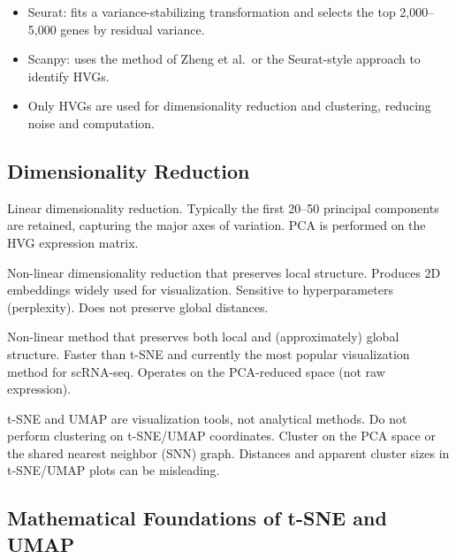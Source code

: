 \begin{itemize}[nosep]
  \item Seurat: fits a variance-stabilizing transformation and selects the top
    2,000--5,000 genes by residual variance.
  \item Scanpy: uses the method of Zheng et al.\ or the Seurat-style approach
    to identify HVGs.
  \item Only HVGs are used for dimensionality reduction and clustering,
    reducing noise and computation.
\end{itemize}

\subsection{Dimensionality Reduction}

\begin{description}[style=nextline]
  \item[PCA (Principal Component Analysis)] Linear dimensionality reduction.
    Typically the first 20--50 principal components are retained, capturing
    the major axes of variation. PCA is performed on the HVG expression matrix.
  \item[t-SNE (t-distributed Stochastic Neighbor Embedding)] Non-linear
    dimensionality reduction that preserves local structure. Produces 2D
    embeddings widely used for visualization. Sensitive to hyperparameters
    (perplexity). Does not preserve global distances.
  \item[UMAP (Uniform Manifold Approximation and Projection)] Non-linear
    method that preserves both local and (approximately) global structure.
    Faster than t-SNE and currently the most popular visualization method
    for scRNA-seq. Operates on the PCA-reduced space (not raw expression).
\end{description}

\begin{warningbox}
t-SNE and UMAP are visualization tools, not analytical methods. Do not perform
clustering on t-SNE/UMAP coordinates. Cluster on the PCA space or the shared
nearest neighbor (SNN) graph. Distances and apparent cluster sizes in t-SNE/UMAP
plots can be misleading.
\end{warningbox}

\subsection{Mathematical Foundations of t-SNE and UMAP}
\label{subsec:scrnaseq:tsne_umap_math}


